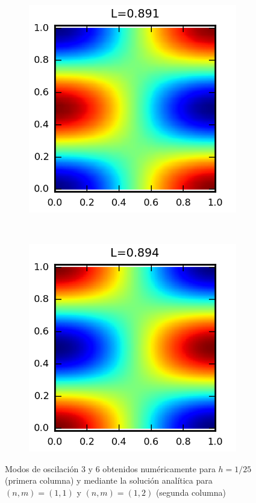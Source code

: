 \begin{figure}
  
  \begin{subfigure}{0.4\textwidth}
    \centering
    \includegraphics{figuras/modonum_6.png}
  \end{subfigure}
  ~
  \begin{subfigure}{0.4\textwidth}
    \centering
    \includegraphics{figuras/modoanalitico_1_2.png}
  \end{subfigure}
  
  \caption{Modos de oscilaci\'on 3 y 6 obtenidos num\'ericamente para $h=1/25$ (primera columna) y mediante la soluci\'on anal\'itica para $(n,m)=(1,1)$ y $(n,m)=(1,2)$ (segunda columna)}
\end{figure}

